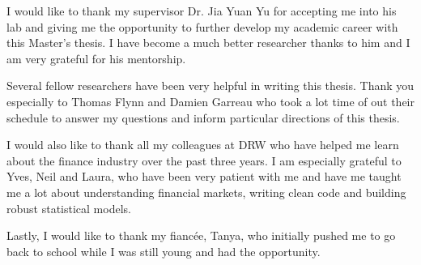 \begin{acknowledgments}
  
  I would like to thank my supervisor Dr. Jia Yuan Yu for accepting me into his lab and giving me the opportunity to further develop my academic career with this Master's thesis. I have become a much better researcher thanks to him and I am very grateful for his mentorship.
  
 Several fellow researchers have been very helpful in writing this thesis. Thank you especially to Thomas Flynn and Damien Garreau who took a lot time of out their schedule to answer my questions and inform particular directions of this thesis.
  
  I would also like to thank all my colleagues at DRW who have helped me learn about the finance industry over the past three years. I am especially grateful to Yves, Neil and Laura, who have been very patient with me and have me taught me a lot about understanding financial markets, writing clean code and building robust statistical models.
  
  Lastly, I would like to thank my fiancée, Tanya, who initially pushed me to go back to school while I was still young and had the opportunity. 
\end{acknowledgments}